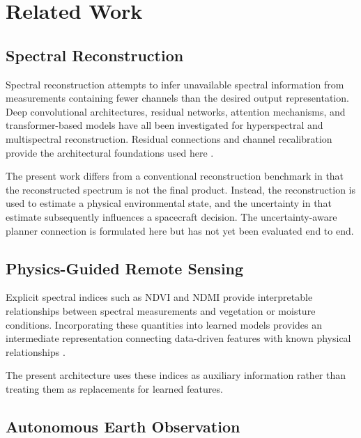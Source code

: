 \documentclass[11pt,a4paper]{article}
\begin{document}

\section{Related Work}

\subsection{Spectral Reconstruction}

Spectral reconstruction attempts to infer unavailable spectral
information from measurements containing fewer channels than the
desired output representation. Deep convolutional architectures,
residual networks, attention mechanisms, and transformer-based models
have all been investigated for hyperspectral and multispectral
reconstruction. Residual connections and channel recalibration provide
the architectural foundations used here
\cite{he2016deep,hu2018squeeze}.

The present work differs from a conventional reconstruction benchmark
in that the reconstructed spectrum is not the final product. Instead,
the reconstruction is used to estimate a physical environmental state,
and the uncertainty in that estimate subsequently influences a
spacecraft decision. The uncertainty-aware planner connection is
formulated here but has not yet been evaluated end to end.

\subsection{Physics-Guided Remote Sensing}

Explicit spectral indices such as NDVI and NDMI provide interpretable
relationships between spectral measurements and vegetation or
moisture conditions. Incorporating these quantities into learned models
provides an intermediate representation connecting data-driven
features with known physical relationships \cite{rouse1974,gao1996,
mcfeeters1996,huete1988,huete2002}.

The present architecture uses these indices as auxiliary information
rather than treating them as replacements for learned features.

\subsection{Autonomous Earth Observation}
\end{document}
